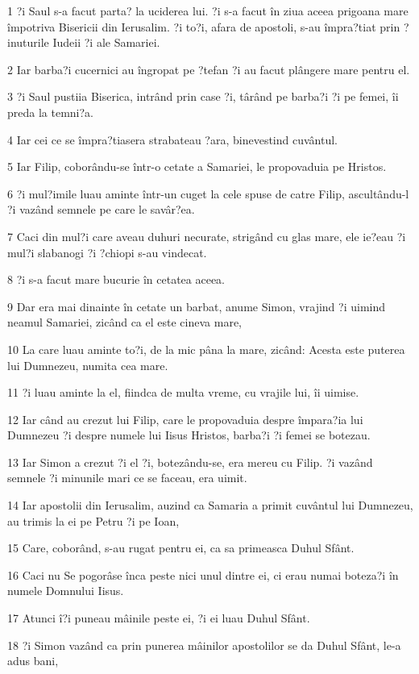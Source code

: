 \par 1 ?i Saul s-a facut parta? la uciderea lui. ?i s-a facut în ziua aceea prigoana mare împotriva Bisericii din Ierusalim. ?i to?i, afara de apostoli, s-au împra?tiat prin ?inuturile Iudeii ?i ale Samariei.
\par 2 Iar barba?i cucernici au îngropat pe ?tefan ?i au facut plângere mare pentru el.
\par 3 ?i Saul pustiia Biserica, intrând prin case ?i, târând pe barba?i ?i pe femei, îi preda la temni?a.
\par 4 Iar cei ce se împra?tiasera strabateau ?ara, binevestind cuvântul.
\par 5 Iar Filip, coborându-se într-o cetate a Samariei, le propovaduia pe Hristos.
\par 6 ?i mul?imile luau aminte într-un cuget la cele spuse de catre Filip, ascultându-l ?i vazând semnele pe care le savâr?ea.
\par 7 Caci din mul?i care aveau duhuri necurate, strigând cu glas mare, ele ie?eau ?i mul?i slabanogi ?i ?chiopi s-au vindecat.
\par 8 ?i s-a facut mare bucurie în cetatea aceea.
\par 9 Dar era mai dinainte în cetate un barbat, anume Simon, vrajind ?i uimind neamul Samariei, zicând ca el este cineva mare,
\par 10 La care luau aminte to?i, de la mic pâna la mare, zicând: Acesta este puterea lui Dumnezeu, numita cea mare.
\par 11 ?i luau aminte la el, fiindca de multa vreme, cu vrajile lui, îi uimise.
\par 12 Iar când au crezut lui Filip, care le propovaduia despre împara?ia lui Dumnezeu ?i despre numele lui Iisus Hristos, barba?i ?i femei se botezau.
\par 13 Iar Simon a crezut ?i el ?i, botezându-se, era mereu cu Filip. ?i vazând semnele ?i minunile mari ce se faceau, era uimit.
\par 14 Iar apostolii din Ierusalim, auzind ca Samaria a primit cuvântul lui Dumnezeu, au trimis la ei pe Petru ?i pe Ioan,
\par 15 Care, coborând, s-au rugat pentru ei, ca sa primeasca Duhul Sfânt.
\par 16 Caci nu Se pogorâse înca peste nici unul dintre ei, ci erau numai boteza?i în numele Domnului Iisus.
\par 17 Atunci î?i puneau mâinile peste ei, ?i ei luau Duhul Sfânt.
\par 18 ?i Simon vazând ca prin punerea mâinilor apostolilor se da Duhul Sfânt, le-a adus bani,
